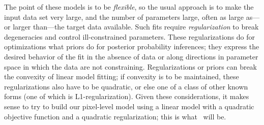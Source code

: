 The point of these models is to be \emph{flexible}, so the usual approach is to make the input data set very large, and the number of parameters large, often as large as---or larger than---the target data available.
Such fits require \emph{regularization} to break degeneracies and control ill-constrained parameters.
These regularizations do for optimizations what priors do for posterior probability inferences; 
they express the desired behavior of the fit in the absence of data or along directions in parameter space in which the data are not constraining.
Regularizations or priors can break the convexity of linear model fitting;
if convexity is to be maintained, these regularizations also have to be quadratic, or else one of a class of other known forms (one of which is L1-regularization).
Given these considerations, it makes sense to try to build our pixel-level model using a linear model with a quadratic objective function and a quadratic regularization; this is what \name\ will be.

